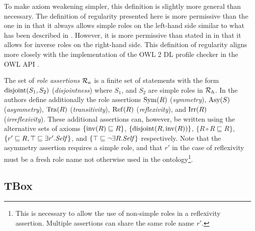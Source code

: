 \begin{example}
\end{example}

\begin{example}
\end{example}

To make axiom weakening simpler, this definition is slightly more general than necessary. The definition of regularity presented here is more permissive than the one in \cite{horrocks2006even} in that it always allows simple roles on the left-hand side similar to what has been described in \cite{rudolph2011foundations}. However, it is more permissive than stated in \cite{rudolph2011foundations} in that it allows for inverse roles on the right-hand side. This definition of regularity aligns more closely with the implementation of the OWL 2 DL \cite{motik2012ontology} profile checker in the OWL API \cite{horridge2011owl,owlapi}.

The set of \emph{role assertions} $\mathcal{R}_a$ is a finite set of statements with the form $\operatorname{disjoint}(S_1, S_2)$ (\emph{disjointness}) where $S_1$, and $S_2$ are simple roles in $\mathcal{R}_h$. In \cite{horrocks2006even} the authors define additionally the role assertions $\operatorname{Sym}(R)$ (\emph{symmetry}), $\operatorname{Asy}(S)$ (\emph{asymmetry}), $\operatorname{Tra}(R)$ (\emph{transitivity}), $\operatorname{Ref}(R)$ (\emph{reflexivity}), and $\operatorname{Irr}(R)$ (\emph{irreflexivity}). These additional assertions can, however, be written using the alternative sets of axioms $\{ \operatorname{inv}(R) \sqsubseteq R \}$, $\{ \operatorname{disjoint}(R, \operatorname{inv}(R)) \}$, $\{ R \circ R \sqsubseteq R \}$, $\{ r' \sqsubseteq R , \top \sqsubseteq \exists r'.\mathit{Self} \}$, and $\{ \top \sqsubseteq \lnot \exists R.\mathit{Self} \}$ respectively. Note that the asymmetry assertion requires a simple role, and that $r'$ in the case of reflexivity must be a fresh role name not otherwise used in the ontology\footnote{This is necessary to allow the use of non-simple roles in a reflexivity assertion. Multiple assertions can share the same role name $r'$.}.

\subsection{TBox} \label{tbox}

